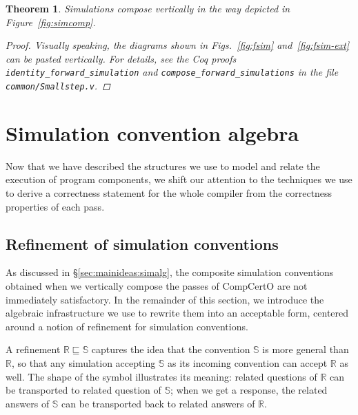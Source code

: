 \documentclass[11pt,oneside,draft]{book}
\newtheorem{theorem}{Theorem}[chapter]
\theoremstyle{definition}
\newcommand{\scref}{\sqsubseteq} %
\begin{document}
\begin{theorem} \label{thm:fsim-vcomp} %
Simulations compose vertically
in the way depicted in Figure~\ref{fig:simcomp}.
\begin{proof}
Visually speaking,
the diagrams shown in Figs.~\ref{fig:fsim} and~\ref{fig:fsim-ext}
can be pasted vertically.
For details,
see the Coq proofs
\texttt{identity\_forward\_simulation}
and \texttt{compose\_forward\_simulations}
in the file \texttt{common/Smallstep.v}.
\end{proof}
\end{theorem}




\section{Simulation convention algebra} \label{sec:simalg} %

Now that we have described the structures we use
to model and relate the execution of program components,
we shift our attention to the techniques we use
to derive a correctness statement for the whole compiler
from the correctness properties of each pass.

\subsection{Refinement of simulation conventions} \label{sec:scref} %

As discussed in \S\ref{sec:mainideas:simalg},
the composite simulation conventions obtained
when we vertically compose the passes of CompCertO
are not immediately satisfactory.
In the remainder of this section,
we introduce the algebraic infrastructure we use
to rewrite them into an acceptable form,
centered around
a notion of refinement for simulation conventions.

A refinement $\mathbb{R} \scref \mathbb{S}$
captures the idea that the convention $\mathbb{S}$
is more general than $\mathbb{R}$,
so that any simulation accepting $\mathbb{S}$ as its
incoming convention can accept $\mathbb{R}$ as well.
The shape of the symbol illustrates its meaning:
related questions of $\mathbb{R}$ can be transported to
related question of $\mathbb{S}$;
when we get a response, the
related answers of $\mathbb{S}$ can be transported back to
related answers of $\mathbb{R}$.
\end{document}
